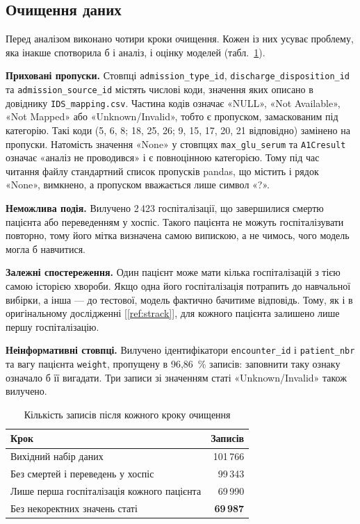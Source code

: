 \documentclass[14pt,a4paper]{extreport}
\begin{document}
\subsection{Очищення даних}

Перед аналізом виконано чотири кроки очищення. Кожен із них усуває проблему, яка інакше спотворила б і аналіз, і оцінку моделей (табл.~\ref{tab:cleaning}).

\textbf{Приховані пропуски.} Стовпці \texttt{admission\_type\_id}, \texttt{discharge\_disposition\_id} та \texttt{admission\_source\_id} містять числові коди, значення яких описано в довіднику \texttt{IDS\_mapping.csv}. Частина кодів означає «NULL», «Not Available», «Not Mapped» або «Unknown/Invalid», тобто є пропуском, замаскованим під категорію. Такі коди (5, 6, 8; 18, 25, 26; 9, 15, 17, 20, 21 відповідно) замінено на пропуски. Натомість значення «None» у стовпцях \texttt{max\_glu\_serum} та \texttt{A1Cresult} означає «аналіз не проводився» і є повноцінною категорією. Тому під час читання файлу стандартний список пропусків pandas, що містить і рядок «None», вимкнено, а пропуском вважається лише символ «?».

\textbf{Неможлива подія.} Вилучено 2\,423 госпіталізації, що завершилися смертю пацієнта або переведенням у хоспіс. Такого пацієнта не можуть госпіталізувати повторно, тому його мітка визначена самою випискою, а не чимось, чого модель могла б навчитися.

\textbf{Залежні спостереження.} Один пацієнт може мати кілька госпіталізацій з тією самою історією хвороби. Якщо одна його госпіталізація потрапить до навчальної вибірки, а інша --- до тестової, модель фактично бачитиме відповідь. Тому, як і в оригінальному дослідженні [\ref{ref:strack}], для кожного пацієнта залишено лише першу госпіталізацію.

\textbf{Неінформативні стовпці.} Вилучено ідентифікатори \texttt{encounter\_id} і \texttt{patient\_nbr} та вагу пацієнта \texttt{weight}, пропущену в 96,86~\% записів: заповнити таку ознаку означало б її вигадати. Три записи зі значенням статі «Unknown/Invalid» також вилучено.

\begin{table}[H]
\caption{Кількість записів після кожного кроку очищення}
\label{tab:cleaning}
\begin{tabularx}{\linewidth}{|X|r|}
\hline
\textbf{Крок} & \textbf{Записів} \\
\hline
Вихідний набір даних & 101\,766 \\
\hline
Без смертей і переведень у хоспіс & 99\,343 \\
\hline
Лише перша госпіталізація кожного пацієнта & 69\,990 \\
\hline
Без некоректних значень статі & \textbf{69\,987} \\
\hline
\end{tabularx}
\end{table}
\end{document}
